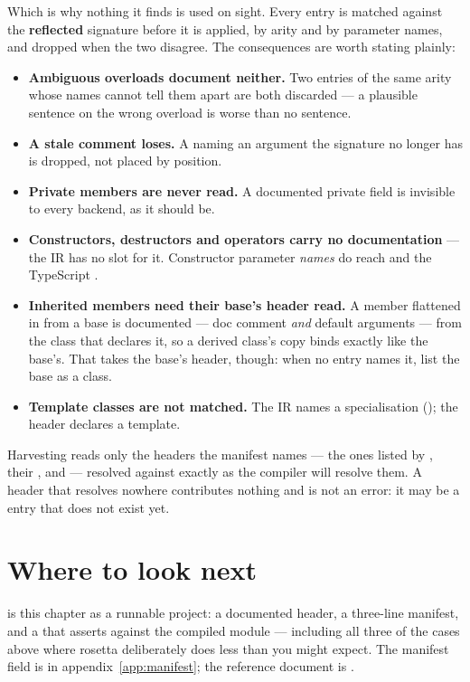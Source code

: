 Which is why nothing it finds is used on sight. Every entry is matched against
the \textbf{reflected} signature before it is applied, by arity and by
parameter names, and dropped when the two disagree. The consequences are worth
stating plainly:

\begin{itemize}[leftmargin=*]
  \item \textbf{Ambiguous overloads document neither.} Two entries of the same
    arity whose names cannot tell them apart are both discarded --- a plausible
    sentence on the wrong overload is worse than no sentence.
  \item \textbf{A stale comment loses.} A  naming an
    argument the signature no longer has is dropped, not placed by position.
  \item \textbf{Private members are never read.} A documented private field is
    invisible to every backend, as it should be.
  \item \textbf{Constructors, destructors and operators carry no documentation}
    --- the IR has no slot for it. Constructor parameter \emph{names} do reach
     and the TypeScript .
  \item \textbf{Inherited members need their base's header read.} A member
    flattened in from a base is documented --- doc comment \emph{and} default
    arguments --- from the class that declares it, so a derived class's copy
    binds exactly like the base's. That takes the base's header, though: when
    no  entry names it, list the base as a class.
  \item \textbf{Template classes are not matched.} The IR names a
    specialisation (); the header declares a template.
\end{itemize}

\begin{note}
Harvesting reads only the headers the manifest names --- the ones listed by
, their , and  --- resolved
against  exactly as the compiler will resolve them. A
header that resolves nowhere contributes nothing and is not an error: it may be
a  entry that does not exist yet.
\end{note}

\section{Where to look next}

 is this chapter as a runnable project: a documented
header, a three-line manifest, and a  that asserts against the
compiled module --- including all three of the cases above where rosetta
deliberately does less than you might expect. The manifest field is in
appendix~\ref{app:manifest}; the reference document is
.
